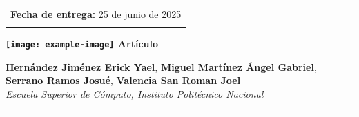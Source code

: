 \documentclass[pdflatex,sn-mathphys-num]{sn-jnl}%
\theoremstyle{thmstyleone}%
\theoremstyle{thmstyletwo}%
\theoremstyle{thmstylethree}%
\begin{document}
\makeatletter
\def\@title{\parbox[t]{\textwidth}{\justifying\LARGE\bfseries Asistente inteligente de riego en tiempo real usando machine learning en un sistema embebido para reducir los costos por consumo de agua}}
\makeatother


\vspace{1cm}

\noindent


\begin{otherlanguage}{english}
\maketitle


\vspace{0.1cm} %

\noindent
\begin{minipage}[t]{0.36\textwidth}
\raggedright
\setlength{\tabcolsep}{0pt}
\renewcommand{\arraystretch}{1.8}

\begin{tabular}{@{}l@{}}
\textbf{Fecha de entrega:} 25 de junio de 2025 \\
\\
\end{tabular}

\vspace{0.2cm}

\textbf{\texttt{[image: example-image]}\hspace{0.3em} Artículo }
\end{minipage}
\hfill
\begin{minipage}[t]{0.6\textwidth}
\raggedright
{\normalsize
\vspace{0.1cm}
\textbf{Hernández Jiménez Erick Yael}, 
\textbf{Miguel Martínez Ángel Gabriel}, 
\textbf{Serrano Ramos Josué}, 
\textbf{Valencia San Roman Joel} \\[0.3em]
\textit{Escuela Superior de Cómputo, Instituto Politécnico Nacional}
}

\vspace{0.3em}

\hrule
\vspace{0.3em}


\end{minipage}
\end{otherlanguage}
\end{document}
